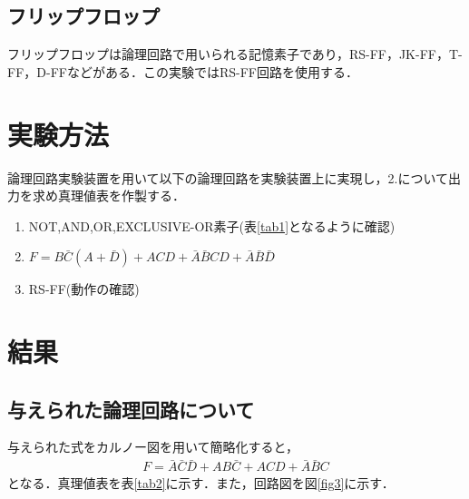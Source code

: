 \documentclass[11pt,a4paper]{jsarticle}
\begin{document}
\newpage



  \subsection{フリップフロップ}
  フリップフロップは論理回路で用いられる記憶素子であり，RS-FF，JK-FF，T-FF，D-FFなどがある．この実験ではRS-FF回路を使用する．

 \section{実験方法}
 論理回路実験装置を用いて以下の論理回路を実験装置上に実現し，2.について出力を求め真理値表を作製する．
\begin{enumerate}
 \item NOT,AND,OR,EXCLUSIVE-OR素子(表\ref{tab1}となるように確認)
 \item $F = B\bar C(A+\bar D)+ACD+\bar A\bar BCD+\bar A\bar B\bar D$
 \item RS-FF(動作の確認)
\end{enumerate}

\section{結果}
  \subsection{与えられた論理回路について}
  与えられた式をカルノー図を用いて簡略化すると，
  \begin{eqnarray*}
   F = \bar A\bar C\bar D + AB\bar C + ACD + \bar A\bar BC
  \end{eqnarray*}
  となる．真理値表を表\ref{tab2}に示す．また，回路図を図\ref{fig3}に示す．
  
\end{document}
